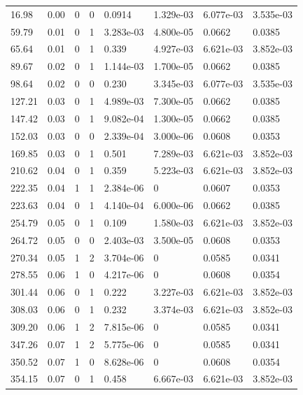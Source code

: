 \documentclass[preview]{standalone}
\begin{document}
{{\begin{tabular}{L{1.2cm}C{1.2cm} C{0.3cm}C{0.5cm} C{1.4cm}C{1.4cm} C{1.4cm}C{1.4cm}}
  16.98  &  0.00  & 0     &  0 &  0.0914  & 1.329e-03  & 6.077e-03 &  3.535e-03   \\ 
  59.79  &  0.01  & 0     &  1 &  3.283e-03  & 4.800e-05  & 0.0662 &  0.0385   \\ 
  65.64  &  0.01  & 0     &  1 &  0.339  & 4.927e-03  & 6.621e-03 &  3.852e-03   \\ 
  89.67  &  0.02  & 0     &  1 &  1.144e-03  & 1.700e-05  & 0.0662 &  0.0385   \\ 
  98.64  &  0.02  & 0     &  0 &  0.230  & 3.345e-03  & 6.077e-03 &  3.535e-03   \\ 
  127.21  &  0.03  & 0     &  1 &  4.989e-03  & 7.300e-05  & 0.0662 &  0.0385   \\ 
  147.42  &  0.03  & 0     &  1 &  9.082e-04  & 1.300e-05  & 0.0662 &  0.0385   \\ 
  152.03  &  0.03  & 0     &  0 &  2.339e-04  & 3.000e-06  & 0.0608 &  0.0353   \\ 
  169.85  &  0.03  & 0     &  1 &  0.501  & 7.289e-03  & 6.621e-03 &  3.852e-03   \\ 
  210.62  &  0.04  & 0     &  1 &  0.359  & 5.223e-03  & 6.621e-03 &  3.852e-03   \\ 
  222.35  &  0.04  & 1     &  1 &  2.384e-06  & 0  & 0.0607 &  0.0353   \\ 
  223.63  &  0.04  & 0     &  1 &  4.140e-04  & 6.000e-06  & 0.0662 &  0.0385   \\ 
  254.79  &  0.05  & 0     &  1 &  0.109  & 1.580e-03  & 6.621e-03 &  3.852e-03   \\ 
  264.72  &  0.05  & 0     &  0 &  2.403e-03  & 3.500e-05  & 0.0608 &  0.0353   \\ 
  270.34  &  0.05  & 1     &  2 &  3.704e-06  & 0  & 0.0585 &  0.0341   \\ 
  278.55  &  0.06  & 1     &  0 &  4.217e-06  & 0  & 0.0608 &  0.0354   \\ 
  301.44  &  0.06  & 0     &  1 &  0.222  & 3.227e-03  & 6.621e-03 &  3.852e-03   \\ 
  308.03  &  0.06  & 0     &  1 &  0.232  & 3.374e-03  & 6.621e-03 &  3.852e-03   \\ 
  309.20  &  0.06  & 1     &  2 &  7.815e-06  & 0  & 0.0585 &  0.0341   \\ 
  347.26  &  0.07  & 1     &  2 &  5.775e-06  & 0  & 0.0585 &  0.0341   \\ 
  350.52  &  0.07  & 1     &  0 &  8.628e-06  & 0  & 0.0608 &  0.0354   \\ 
  354.15  &  0.07  & 0     &  1 &  0.458  & 6.667e-03  & 6.621e-03 &  3.852e-03   \\ 

\end{tabular}}}
\end{document}
